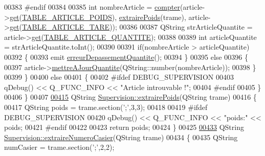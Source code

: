 \begin{DoxyCode}
{{{00383 \textcolor{preprocessor}{        #endif}
00384 
00385         \textcolor{keywordtype}{int} nombreArticle = \hyperlink{class_supervision_a81b1b8960cb2857be4a6789cf27cd413}{compter}(article->\hyperlink{class_article_a81e89d4821991a69277f3a0f8e88a001}{get}(\hyperlink{_article_8h_a159354683cfd6e1b578172fbe6490ab6a8e65e0dbe78b66152adb0ffd76dd2ece}{TABLE\_ARTICLE\_POIDS}), 
      \hyperlink{class_supervision_afdef41cd85f2ecfae9d1dc46f556a034}{extrairePoids}(trame), article->\hyperlink{class_article_a81e89d4821991a69277f3a0f8e88a001}{get}(\hyperlink{_article_8h_a159354683cfd6e1b578172fbe6490ab6a970d883b74adb323da887e30bef922f5}{TABLE\_ARTICLE\_TARE}));
00386 
00387         QString strArticleQuantite = article->\hyperlink{class_article_a81e89d4821991a69277f3a0f8e88a001}{get}(\hyperlink{_article_8h_a159354683cfd6e1b578172fbe6490ab6a7273e06be37f8ea80b1c9c16224ebb86}{TABLE\_ARTICLE\_QUANTITE});
00388 
00389         \textcolor{keywordtype}{int} articleQuantite = strArticleQuantite.toInt();
00390 
00391         \textcolor{keywordflow}{if}(nombreArticle > articleQuantite)
00392         \{
00393             emit \hyperlink{class_supervision_a3fb19a3c16324a21af956fd272ca469d}{erreurDepassementQuantite}();
00394         \}
00395         \textcolor{keywordflow}{else}
00396         \{
00397             article->\hyperlink{class_article_a5777f36d74974ff21e712a9875c2d8bf}{mettreAJourQuantite}(QString::number(nombreArticle));
00398         \}
00399     \}
00400     \textcolor{keywordflow}{else}
00401     \{
00402 \textcolor{preprocessor}{        #ifdef DEBUG\_SUPERVISION}
00403             qDebug() << Q\_FUNC\_INFO << \textcolor{stringliteral}{"Article introuvable !"};
00404 \textcolor{preprocessor}{        #endif}
00405     \}
00406 \}
00407 
\hyperlink{class_supervision_afdef41cd85f2ecfae9d1dc46f556a034}{00415} QString \hyperlink{class_supervision_afdef41cd85f2ecfae9d1dc46f556a034}{Supervision::extrairePoids}(QString trame)
00416 \{
00417     QString poids = trame.section(\textcolor{charliteral}{';'},3,3);
00418 
00419 \textcolor{preprocessor}{    #ifdef DEBUG\_SUPERVISION}
00420         qDebug() << Q\_FUNC\_INFO << \textcolor{stringliteral}{"poids:"} << poids;
00421 \textcolor{preprocessor}{    #endif}
00422 
00423     \textcolor{keywordflow}{return} poids;
00424 \}
00425 
\hyperlink{class_supervision_a141a35024b0cb74636a8c6810a1ab26d}{00433} QString \hyperlink{class_supervision_a141a35024b0cb74636a8c6810a1ab26d}{Supervision::extraireNumeroCasier}(QString trame)
00434 \{
00435     QString numCasier = trame.section(\textcolor{charliteral}{';'},2,2);
}}}
\end{DoxyCode}
